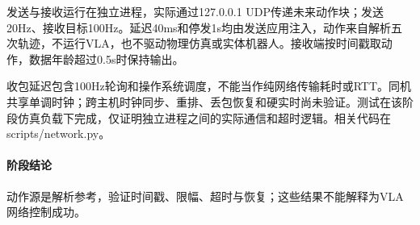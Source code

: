 发送与接收运行在独立进程，实际通过127.0.0.1 UDP传递未来动作块；发送20Hz、接收目标100Hz。延迟40ms和停发1s均由发送应用注入，动作来自解析五次轨迹，不运行VLA，也不驱动物理仿真或实体机器人。接收端按时间戳取动作，数据年龄超过0.5s时保持输出。

收包延迟包含100Hz轮询和操作系统调度，不能当作纯网络传输耗时或RTT。同机共享单调时钟；跨主机时钟同步、重排、丢包恢复和硬实时尚未验证。测试在该阶段仿真负载下完成，仅证明独立进程之间的实际通信和超时逻辑。相关代码在 scripts/network.py。


\paragraph{阶段结论}动作源是解析参考，验证时间戳、限幅、超时与恢复；这些结果不能解释为VLA网络控制成功。


\FloatBarrier
